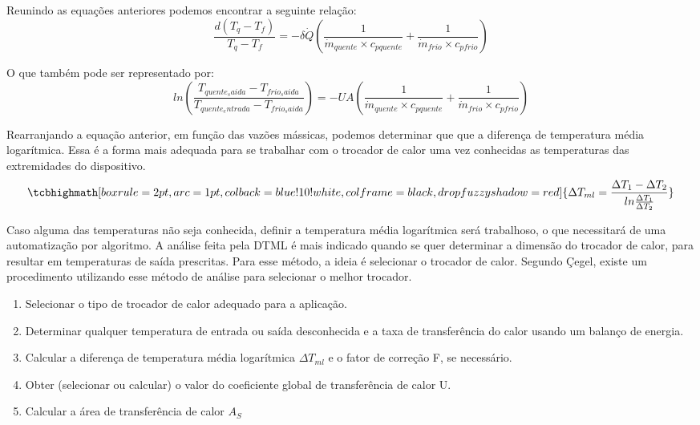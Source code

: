 \documentclass[a4paper,12pt,oneside]{article}
\begin{document}
\begin{flushright}
Reunindo as equações anteriores podemos encontrar a seguinte relação:\\

\begin{equation}\label{eq21}
	\frac{d(T_{q} - T_{f})}{T_{q} - T_{f}} = -\delta\dot{Q} \left(  \frac{1}{\dot{m}_{quente} \times c_{pquente}} + \frac{1}{\dot{m}_{frio} \times c_{pfrio}}  \right)  
		\end{equation}
		\vspace{0.5cm}

O que também pode ser representado por:\\

 \begin{equation}\label{eq22}
 ln \left( \frac{T_{quente_saida} - T_{frio_saida}}{T_{quente_entrada} - T_{frio_saida}}     \right) =   -UA \left(  \frac{1}{\dot{m}_{quente} \times c_{pquente}} + \frac{1}{\dot{m}_{frio} \times c_{pfrio}}  \right)
 \end{equation}
 \vspace{0.5cm}
 
Rearranjando a equação anterior, em função das vazões mássicas, podemos determinar que que a diferença de temperatura média logarítmica. Essa é a forma mais adequada para se trabalhar com o trocador de calor uma vez conhecidas as temperaturas das extremidades do dispositivo.\\

 \begin{equation}\label{eq23}
 	\tcbhighmath[boxrule=2pt,arc=1pt,colback=blue!10!white,colframe=black,
drop fuzzy shadow=red]{\Delta T_{ml} = \frac{\Delta T_{1} - \Delta T_{2}}{ln \frac{\Delta T_{1}}{\Delta T_{2}}}}
\end{equation}
\vspace{0.5cm}

Caso alguma das temperaturas não seja conhecida, definir a temperatura média logarítmica será trabalhoso, o que necessitará de uma automatização por algoritmo. A análise feita pela DTML é mais indicado quando se quer determinar a dimensão do trocador de calor, para resultar em temperaturas de saída prescritas. Para esse método, a ideia é selecionar o trocador de calor. Segundo Çegel, existe um procedimento utilizando esse método de análise para selecionar o melhor trocador.\\

\begin{enumerate}
	\item Selecionar o tipo de trocador de calor adequado para a aplicação. 
	\item Determinar qualquer temperatura de entrada ou saída desconhecida e a
	taxa de transferência do calor usando um balanço de energia. 
	\item Calcular a diferença de temperatura média logarítmica $\Delta T_{ml}$ e o fator de
	correção F, se necessário.  
	\item  Obter (selecionar ou calcular) o valor do coeficiente global de
	transferência de calor U. 
	\item Calcular a área de transferência de calor $A_{S}$
\end{enumerate}
\vspace{0.5cm}


\end{flushright}
\end{document}
